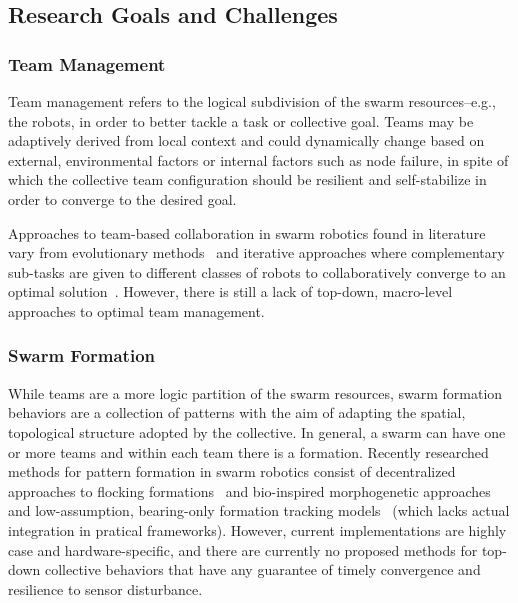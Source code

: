 \documentclass[12pt]{article}
\begin{document}
\subsection{Research Goals and Challenges}
\label{sec:challenges}

\subsubsection{Team Management}
Team management refers to the logical subdivision of the swarm resources--e.g., the robots, in order to better tackle a task or collective goal.
Teams may be adaptively derived from local context and could dynamically change based on external, environmental factors or internal factors such as node failure, in spite of
which the collective team configuration should be resilient and self-stabilize in order to converge to the desired goal.

Approaches to team-based collaboration in swarm robotics found in literature vary from evolutionary methods~\cite{ferrante2015evolution} and iterative approaches where complementary
sub-tasks are given to different classes of robots to collaboratively converge to an optimal solution~\cite{ducatelle2010cooperative}. However, there is still a lack of top-down, macro-level
approaches to optimal team management. 

\subsubsection{Swarm Formation}
While teams are a more logic partition of the swarm resources, swarm formation behaviors are a collection of patterns with the aim of adapting the 
spatial, topological structure adopted by the collective. In general, a swarm can have one or more teams and within each team there is a formation.
Recently researched methods for pattern formation in swarm robotics consist of decentralized approaches to flocking formations~\cite{ferrante2012self} and
bio-inspired morphogenetic approaches~\cite{oh2017bio} and low-assumption, bearing-only formation tracking models~\cite{zhao2019bearing} (which lacks actual integration in pratical frameworks). 
However, current implementations are highly case and hardware-specific, and there are currently no proposed methods for top-down collective behaviors that have any guarantee of
timely convergence and resilience to sensor disturbance. 
\end{document}
